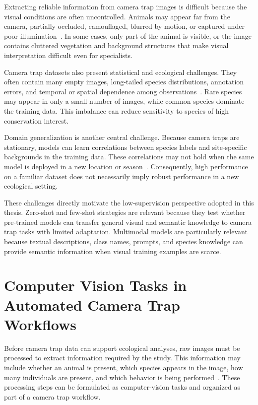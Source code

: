 Extracting reliable information from camera trap images is difficult because the visual conditions are often uncontrolled. Animals may appear far from the camera, partially occluded, camouflaged, blurred by motion, or captured under poor illumination~\citep{villa2017towards, norouzzadeh2018automatically, beery2018recognition, gomez2016animal}. In some cases, only part of the animal is visible, or the image contains cluttered vegetation and background structures that make visual interpretation difficult even for specialists.

Camera trap datasets also present statistical and ecological challenges. They often contain many empty images, long-tailed species distributions, annotation errors, and temporal or spatial dependence among observations~\citep{norouzzadeh2018automatically, schneider2020three, brookes2025panaf, bevan2025deep}. Rare species may appear in only a small number of images, while common species dominate the training data. This imbalance can reduce sensitivity to species of high conservation interest.

Domain generalization is another central challenge. Because camera traps are stationary, models can learn correlations between species labels and site-specific backgrounds in the training data. These correlations may not hold when the same model is deployed in a new location or season~\citep{beery2018recognition, schneider2020three, tabak2019machine, norman2023can}. Consequently, high performance on a familiar dataset does not necessarily imply robust performance in a new ecological setting.

These challenges directly motivate the low-supervision perspective adopted in this thesis. Zero-shot and few-shot strategies are relevant because they test whether pre-trained models can transfer general visual and semantic knowledge to camera trap tasks with limited adaptation. Multimodal models are particularly relevant because textual descriptions, class names, prompts, and species knowledge can provide semantic information when visual training examples are scarce.

\section{Computer Vision Tasks in Automated Camera Trap Workflows}

Before camera trap data can support ecological analyses, raw images must be processed to extract information required by the study. This information may include whether an animal is present, which species appears in the image, how many individuals are present, and which behavior is being performed~\citep{norouzzadeh2018automatically}. These processing steps can be formulated as computer-vision tasks and organized as part of a camera trap workflow.

